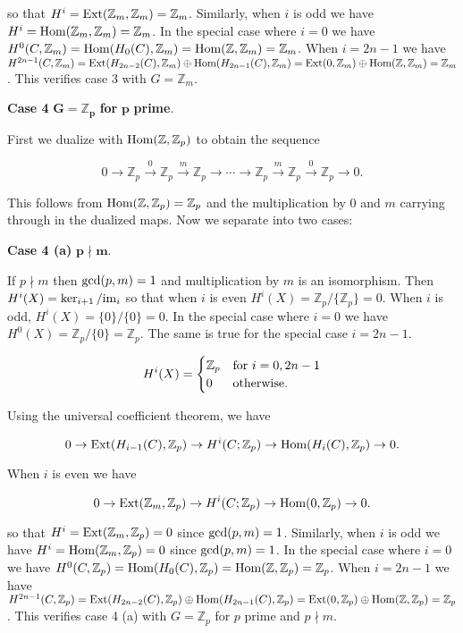 \documentclass{article}
\newcommand{\Z}{\mathbb{Z}}
\newcommand{\Hom}{\textnormal{Hom}}
\newcommand{\Ext}{\textnormal{Ext}}
\newcommand{\im}{\textnormal{im}}
\begin{document}
so that $H^{i} = \Ext(\Z_{m},\Z_{m}) = \Z_{m}$. Similarly, when $i$ is odd we have $H^{i} = \Hom(\Z_{m},\Z_{m}) = \Z_{m}$. In the special case where $i = 0$ we have $H^{0}(C, \Z_{m}) = \Hom(H_{0}(C), \Z_{m}) = \Hom(\Z, \Z_{m}) = \Z_{m}$. When $i = 2n-1$ we have $H^{2n-1}(C, \Z_{m}) = \Ext(H_{2n-2}(C), \Z_{m})\oplus\Hom(H_{2n-1}(C), \Z_{m}) = \Ext(0, \Z_{m})\oplus\Hom(\Z, \Z_{m}) = \Z_{m}$. This verifies case 3 with $G = \Z_{m}$.
\bigskip

\textbf{Case 4} $\mathbf{G = \Z_{p}}$ \textbf{for} $\mathbf{p}$ \textbf{prime}.

First we dualize with $\Hom(\Z, \Z_{p})$ to obtain the sequence

$$0\to \Z_{p}\xrightarrow{0} \Z_{p}\xrightarrow{m} \Z_{p}\to \cdots \to \Z_{p} \xrightarrow{m}\Z_{p} \xrightarrow{0}\Z_{p}\to 0.$$

This follows from $\Hom(\Z, \Z_{p}) = \Z_{p}$ and the multiplication by 0 and $m$ carrying through in the dualized maps. Now we separate into two cases:
\medskip

\textbf{Case 4 (a)} $\mathbf{p\nmid m}$.

If $p\nmid m$ then $\textnormal{gcd}(p, m) = 1$ and multiplication by $m$ is an isomorphism. Then $H^{i}(X) = \ker_{i+1}/\im_{i}$ so that when $i$ is even $H^{i}(X) = \Z_{p}/\{\Z_{p}\} = 0$. When $i$ is odd, $H^{i}(X) = \{0\}/\{0\} = 0$. In the special case where $i = 0$ we have $H^{0}(X) = \Z_{p}/\{0\} = \Z_{p}$. The same is true for the special case $i = 2n-1$.

\[H^{i}(X) = \begin{cases} \Z_{p} & \textnormal{for } i = 0, 2n-1\\
0 & \textnormal{otherwise}. \end{cases}\]
\medskip

Using the universal coefficient theorem, we have

$$0\to \Ext(H_{i-1}(C), \Z_{p})\to H^{i}(C;\Z_{p})\to \Hom(H_{i}(C),\Z_{p})\to 0.$$

When $i$ is even we have

$$0\to \Ext(\Z_{m}, \Z_{p})\to H^{i}(C;\Z_{p})\to \Hom(0,\Z_{p})\to 0.$$

so that $H^{i} = \Ext(\Z_{m},\Z_{p}) = 0$ since $\textnormal{gcd}(p, m) = 1$. Similarly, when $i$ is odd we have $H^{i} = \Hom(\Z_{m},\Z_{p}) = 0$ since $\textnormal{gcd}(p, m) = 1$. In the special case where $i = 0$ we have $H^{0}(C, \Z_{p}) = \Hom(H_{0}(C), \Z_{p}) = \Hom(\Z, \Z_{p}) = \Z_{p}$. When $i = 2n-1$ we have $H^{2n-1}(C, \Z_{p}) = \Ext(H_{2n-2}(C), \Z_{p})\oplus\Hom(H_{2n-1}(C), \Z_{p}) = \Ext(0, \Z_{p})\oplus\Hom(\Z, \Z_{p}) = \Z_{p}$. This verifies case 4 (a) with $G = \Z_{p}$ for $p$ prime and $p\nmid m$.
\medskip
\end{document}
